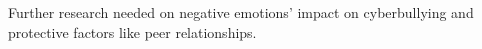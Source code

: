 Further research needed on negative emotions' impact on cyberbullying and protective factors like peer relationships.